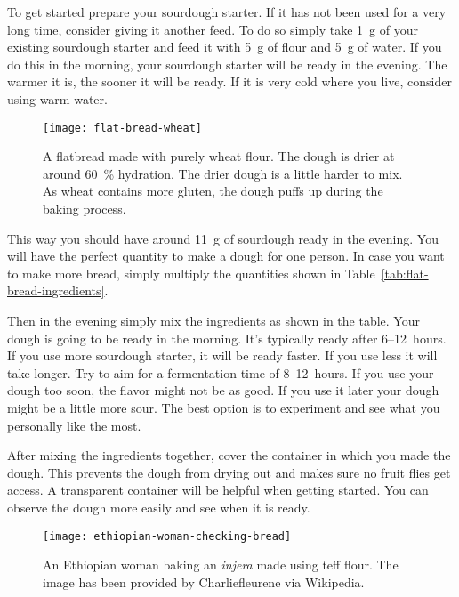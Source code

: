 To get started prepare your sourdough starter. If it has not been used for a very
long time, consider giving it another feed. To do so simply take \qty{1}{\gram} of your
existing sourdough starter and feed it with \qty{5}{\gram} of flour and \qty{5}{\gram} of water.
If you do this in the morning, your sourdough starter will be ready in the evening. The
warmer it is, the sooner it will be ready. If it is very cold where you live, consider
using warm water.

\begin{figure}[htb!]
\begin{center}
  \texttt{[image: flat-bread-wheat]}
  \caption[Wheat flatbread]{A flatbread made with purely wheat flour. The
      dough is drier at around \qty{60}{\percent} hydration. The drier dough
      is a little harder to mix. As wheat contains more gluten, the dough
      puffs up during the baking process.}
\end{center}
\end{figure}

This way you should have around \qty{11}{\gram} of sourdough ready in the evening. You will have
the perfect quantity to make a dough for one person. In case you want to make more
bread, simply multiply the quantities shown in
Table~\ref{tab:flat-bread-ingredients}.

Then in the evening simply mix the ingredients as shown in the table. Your dough
is going to be ready in the morning. It's typically ready after 6--12~hours. If
you use more sourdough starter, it will be ready faster. If you use less it will take
longer. Try to aim for a fermentation time of 8--12~hours. If you use
your dough too soon, the flavor might not be as good. If you use it later
your dough might be a little more sour. The best option is to experiment
and see what you personally like the most.

After mixing the ingredients together, cover the container in which
you made the dough. This prevents the dough from drying out and makes
sure no fruit flies get access. A transparent container will be helpful
when getting started. You can observe the dough more easily and see when
it is ready.

\begin{figure}[htb!]
\begin{center}
  \texttt{[image: ethiopian-woman-checking-bread]}
  \caption[Ethiopian \emph{injera}]{An Ethiopian woman baking an \emph{injera}
      made using teff flour.  The image has been provided by Charliefleurene
      via Wikipedia.}
\end{center}
\end{figure}

